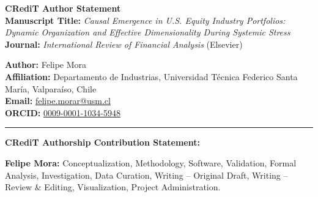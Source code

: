 \documentclass[12pt]{article}
\begin{document}
\pagestyle{empty}

\begin{center}
    {\Large \textbf{CRediT Author Statement}}\\[4mm]
    \textbf{Manuscript Title:} \emph{Causal Emergence in U.S. Equity Industry Portfolios: Dynamic Organization and Effective Dimensionality During Systemic Stress}\\[2mm]
    \textbf{Journal:} \emph{International Review of Financial Analysis} (Elsevier)\\[6mm]
\end{center}

\noindent \textbf{Author:} Felipe Mora \\
\textbf{Affiliation:} Departamento de Industrias, Universidad Técnica Federico Santa María, Valparaíso, Chile \\
\textbf{Email:} \href{mailto:felipe.morar@usm.cl}{felipe.morar@usm.cl} \\
\textbf{ORCID:} \href{https://orcid.org/0009-0001-1034-5948}{0009-0001-1034-5948}

\vspace{6mm}
\hrule
\vspace{6mm}

\noindent \textbf{CRediT Authorship Contribution Statement:}

\vspace{4mm}
\noindent \textbf{Felipe Mora:} Conceptualization, Methodology, Software, Validation, Formal Analysis, Investigation, Data Curation, Writing – Original Draft, Writing – Review \& Editing, Visualization, Project Administration.
\end{document}
